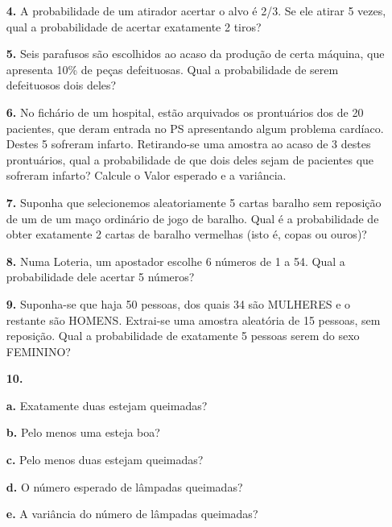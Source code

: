 \begin{itemize}
\begin{itemize}
	\end{itemize}
	\item[\textbf{4.}] A probabilidade de um atirador acertar o alvo é 2/3. Se ele atirar 5 vezes, qual a probabilidade de acertar exatamente 2 tiros?
	\resposta{} 
	\item[\textbf{5.}] Seis parafusos são escolhidos ao acaso da produção de certa máquina, que apresenta 10\% de peças defeituosas. Qual a probabilidade de serem defeituosos dois deles?
	\resposta{} 
	\item[\textbf{6.}] No fichário de um hospital, estão arquivados os prontuários dos de 20 pacientes, que deram entrada no PS apresentando algum problema cardíaco. Destes 5 sofreram infarto. Retirando-se uma amostra ao acaso de 3 destes prontuários, qual a probabilidade de que dois deles sejam de pacientes que sofreram infarto? Calcule o Valor esperado e a variância.
	\resposta{} 
	\item[\textbf{7.}] Suponha que selecionemos aleatoriamente 5 cartas baralho sem reposição de um de um maço ordinário de jogo de baralho. Qual é a probabilidade de obter exatamente 2 cartas de baralho vermelhas (isto é, copas ou ouros)?
	\resposta{} 
	\item[\textbf{8.}] Numa Loteria, um apostador escolhe 6 números de 1 a 54. Qual a probabilidade dele acertar 5 números?
	\resposta{} 
	\item[\textbf{9.}] Suponha-se que haja 50 pessoas, dos quais 34 são MULHERES e o restante são HOMENS. Extrai-se uma amostra aleatória de 15 pessoas, sem reposição. Qual a probabilidade de exatamente 5 pessoas serem do sexo FEMININO?
	\resposta{} 
	
	\item[\textbf{10.}] 
	    \item[\textbf{a.}] Exatamente duas estejam queimadas?
	    \item[\textbf{b.}] Pelo menos uma esteja boa? \item[\textbf{c.}] Pelo menos duas estejam queimadas?
	    \item[\textbf{d.}] O número esperado de lâmpadas queimadas? \item[\textbf{e.}] A variância do número de lâmpadas queimadas?
	
\end{itemize}